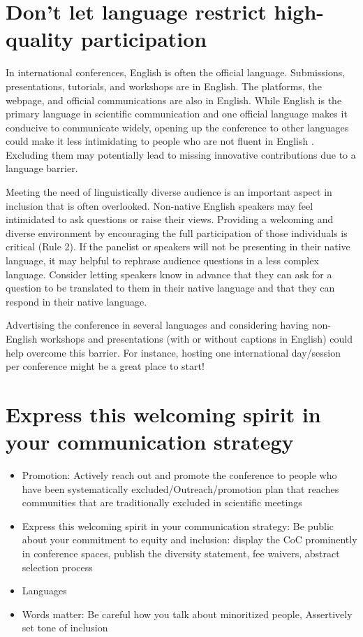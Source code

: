 \documentclass[10pt,letterpaper]{article}
\begin{document}
\section{Don't let language restrict high-quality participation}
\label{rule_language}

In international conferences, English is often the official language. Submissions, presentations, tutorials, and workshops are in English. The platforms, the webpage, and official communications are also in English. While English is the primary language in scientific communication and one official language makes it conducive to communicate widely, opening up the conference to other languages could make it less intimidating to people who are not fluent in English \cite{ninerBetterWhomLeveling2021}. Excluding them may potentially lead to missing innovative contributions due to a language barrier. 

Meeting the need of linguistically diverse audience is an important aspect in inclusion that is often overlooked. Non-native English speakers may feel intimidated to ask questions or raise their views. Providing a welcoming and diverse environment by encouraging the full participation of those individuals is critical (Rule 2). If the panelist or speakers will not be presenting in their native language, it may helpful to rephrase audience questions in a less complex language. Consider letting speakers know in advance that they can ask for a question to be translated to them in their native language and that they can respond in their native language.

Advertising the conference in several languages and considering having non-English workshops and presentations (with or without captions in English) could help overcome this barrier. For instance, hosting one international day/session per conference might be a great place to start!

\section{Express this welcoming spirit in your communication strategy}
\label{rule_communication}
\begin{itemize}
    \item Promotion: Actively reach out and promote the conference to people who have been systematically excluded/Outreach/promotion plan that reaches communities that are traditionally excluded in scientific meetings
    \item Express this welcoming spirit in your communication strategy: Be public about your commitment to equity and inclusion: display the CoC prominently in conference spaces, publish the diversity statement, fee waivers, abstract selection process
    \item Languages
    \item Words matter: Be careful how you talk about minoritized people, Assertively set tone of inclusion
\end{itemize}
  
\end{document}

